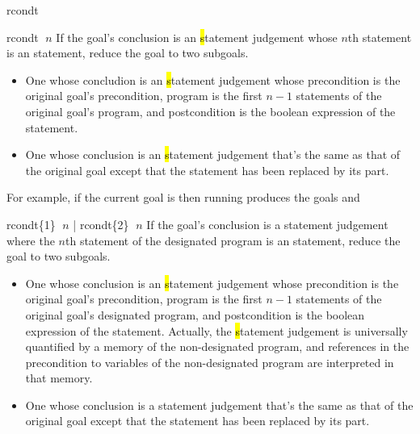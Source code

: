 \begin{tactic}{rcondt}
  \begin{tsyntax}{rcondt $\;n$}
    If the goal's conclusion is an \hl statement judgement whose $n$th
    statement is an  statement, reduce the goal to two
    subgoals.
    \begin{itemize}
    \item One whose concludion is an \hl statement judgement whose
      precondition is the original goal's precondition, program is the
      first $n-1$ statements of the original goal's program, and
      postcondition is the boolean expression of the 
      statement.
   
    \item One whose conclusion is an \hl statement judgement that's
      the same as that of the original goal except that the 
      statement has been replaced by its  part.
    \end{itemize}

    \medskip For example, if the current goal is
     then
    running 
    produces the goals
     and
  \end{tsyntax}

  \begin{tsyntax}{rcondt\{1\} $\;n$ | rcondt\{2\} $\;n$}
    If the goal's conclusion is a \prhl statement judgement where the
    $n$th statement of the designated program is an  statement,
    reduce the goal to two subgoals.
    \begin{itemize}
    \item One whose conclusion is an \hl statement judgement whose
      precondition is the original goal's precondition, program is the
      first $n-1$ statements of the original goal's designated
      program, and postcondition is the boolean expression of the
       statement. Actually, the \hl statement judgement is
      universally quantified by a memory of the non-designated
      program, and references in the precondition to variables of the
      non-designated program are interpreted in that memory.
   
    \item One whose conclusion is a \prhl statement judgement that's
      the same as that of the original goal except that the 
      statement has been replaced by its  part.
    \end{itemize}


\end{tsyntax}
\end{tactic}
